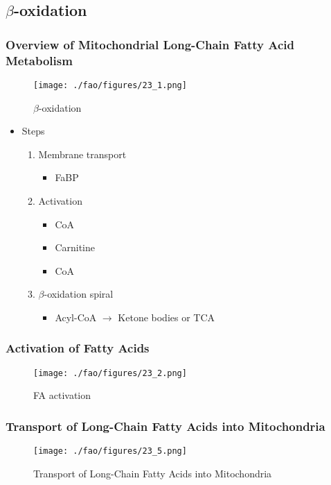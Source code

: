 \documentclass{scrartcl}
\begin{document}
\subsection{\(\beta\)-oxidation}
\label{sec:orga27f64e}
\subsubsection{Overview of Mitochondrial Long-Chain Fatty Acid Metabolism}
\label{sec:org0b773f2}

\begin{figure}[htbp]
\centering
\texttt{[image: ./fao/figures/23\_1.png]}
\caption{\label{fig:org20b84bf}
\(\beta\)-oxidation}
\end{figure}

\begin{itemize}
\item Steps 
\begin{enumerate}
\item Membrane transport
\begin{itemize}
\item FaBP
\end{itemize}
\item Activation
\begin{itemize}
\item CoA
\item Carnitine
\item CoA
\end{itemize}
\item \(\beta\)-oxidation spiral
\begin{itemize}
\item Acyl-CoA \(\to\) Ketone bodies or TCA
\end{itemize}
\end{enumerate}
\end{itemize}

\subsubsection{Activation of Fatty Acids}
\label{sec:orgac92760}
\begin{figure}[htbp]
\centering
\texttt{[image: ./fao/figures/23\_2.png]}
\caption{\label{fig:orgd1e0b85}
FA activation}
\end{figure}

\subsubsection{Transport of Long-Chain Fatty Acids into Mitochondria}
\label{sec:org7985bef}
\begin{figure}[htbp]
\centering
\texttt{[image: ./fao/figures/23\_5.png]}
\caption{\label{fig:org542970e}
Transport of Long-Chain Fatty Acids into Mitochondria}
\end{figure}
\end{document}
